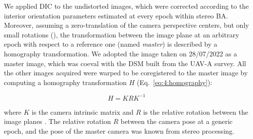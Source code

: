 

We applied DIC to the undistorted images, which were corrected according to the interior orientation parameters estimated at every epoch within stereo BA.
Moreover, assuming a zero-translation of the camera perspective centers, but only small rotations (), the transformation between the image plane at an arbitrary epoch with respect to a reference one (named \textit{master}) is described by a homography transformation.
We adopted the image taken on 28/07/2022 as a master image, which was coeval with the DSM built from the UAV-A survey.
All the other images acquired were warped to be coregistered to the master image by computing a homography transformation \(H\) (Eq.~\ref{eq:4:homography}):

\begin{equation}
  H = KRK^{-1}
  \label{eq:4:homography}
\end{equation}

where \(K\) is the camera intrinsic matrix and \(R\) is the relative rotation between the image planes \citep{forstner2016}.
The relative rotation \(R\) between the camera pose at a generic epoch, and the pose of the master camera was known from stereo processing.

